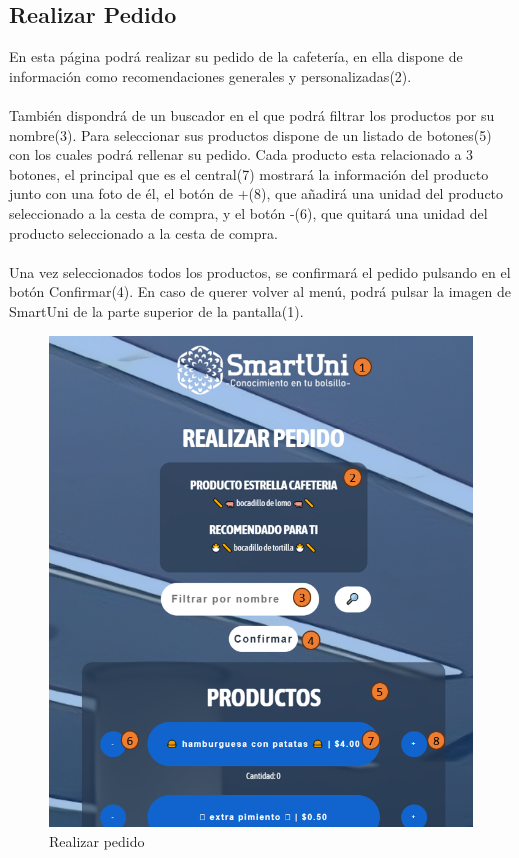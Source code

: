 \documentclass[12pt]{report}
\begin{document}
\begin{appendices}
\section{Realizar Pedido}
En esta página podrá realizar su pedido de la cafetería, en ella dispone de información como recomendaciones generales y personalizadas(2). 
\\\\También dispondrá de un buscador en el que podrá filtrar los productos por su nombre(3). Para seleccionar sus productos dispone de un listado de botones(5) con los cuales podrá rellenar su pedido. Cada producto esta relacionado a 3 botones, el principal que es el central(7) mostrará la información del producto junto con una foto de él, el botón de +(8), que añadirá una unidad del producto seleccionado a la cesta de compra, y el botón -(6), que quitará una unidad del producto seleccionado a la cesta de compra. \\\\Una vez seleccionados todos los productos, se confirmará el pedido pulsando en el botón Confirmar(4). En caso de querer volver al menú, podrá pulsar la imagen de SmartUni de la parte superior de la pantalla(1).\\
\begin{figure}[H]
    \centering
    \includegraphics[scale = 0.65]{imagenes//manual_de_usuario/10.png}
    \caption{Realizar pedido}
    \label{fig:enter-label}
\end{figure}
\newpage

\end{appendices}
\end{document}
